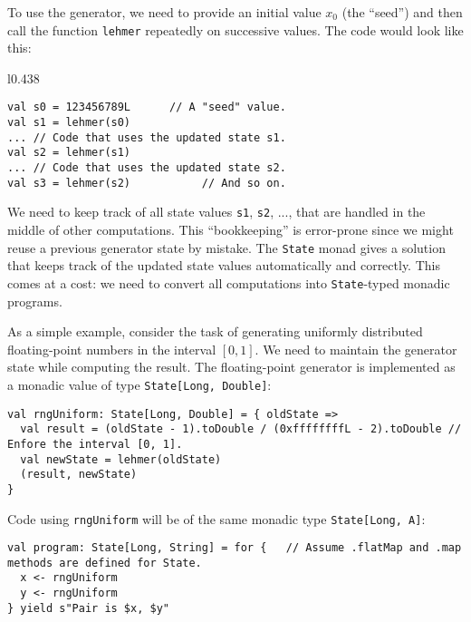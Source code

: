 To use the generator, we need to provide an initial value $x_{0}$
(the \textsf{``}seed\textsf{''}) and then call the function \lstinline!lehmer! repeatedly
on successive values. The code would look like this:

\begin{wrapfigure}{l}{0.438\columnwidth}%
\vspace{-0.8\baselineskip}
\begin{lstlisting}
val s0 = 123456789L      // A "seed" value.
val s1 = lehmer(s0)
... // Code that uses the updated state s1.
val s2 = lehmer(s1)
... // Code that uses the updated state s2.
val s3 = lehmer(s2)           // And so on.
\end{lstlisting}

\vspace{-1\baselineskip}
\end{wrapfigure}%

\noindent We need to keep track of all state values \lstinline!s1!,
\lstinline!s2!, ..., that are handled in the middle of other computations.
This \textsf{``}bookkeeping\textsf{''} is error-prone since we might reuse a previous
generator state by mistake. The \lstinline!State! monad gives a solution
that keeps track of the updated state values automatically and correctly.
This comes at a cost: we need to convert all computations into \lstinline!State!-typed
monadic programs.

As a simple example, consider the task of generating uniformly distributed
floating-point numbers in the interval $\left[0,1\right]$. We need
to maintain the generator state while computing the result. The floating-point
generator is implemented as a monadic value of type \lstinline!State[Long, Double]!:
\begin{lstlisting}
val rngUniform: State[Long, Double] = { oldState =>
  val result = (oldState - 1).toDouble / (0xffffffffL - 2).toDouble // Enfore the interval [0, 1].
  val newState = lehmer(oldState)
  (result, newState)
}
\end{lstlisting}
Code using \lstinline!rngUniform! will be of the same monadic type
\lstinline!State[Long, A]!:
\begin{lstlisting}
val program: State[Long, String] = for {   // Assume .flatMap and .map methods are defined for State.
  x <- rngUniform
  y <- rngUniform
} yield s"Pair is $x, $y"
\end{lstlisting}

